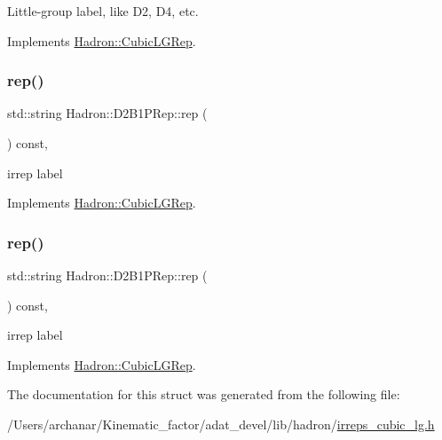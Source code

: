 Little-\/group label, like D2, D4, etc. 

Implements \mbox{\hyperlink{structHadron_1_1CubicLGRep_a9bdb14b519a611d21379ed96a3a9eb41}{Hadron\+::\+Cubic\+L\+G\+Rep}}.

\mbox{\label{structHadron_1_1D2B1PRep_ab8cddfe5f5e849b0b3d804576558b445}} 
\subsubsection{\texorpdfstring{rep()}{rep()}\hspace{0.1cm}{\footnotesize\ttfamily [1/2]}}
{\footnotesize\ttfamily std\+::string Hadron\+::\+D2\+B1\+P\+Rep\+::rep (\begin{DoxyParamCaption}{ }\end{DoxyParamCaption}) const\hspace{0.3cm}{\ttfamily [inline]}, {\ttfamily [virtual]}}

irrep label 

Implements \mbox{\hyperlink{structHadron_1_1CubicLGRep_a50f5ddbb8f4be4cee0106fa9e8c75e6c}{Hadron\+::\+Cubic\+L\+G\+Rep}}.

\mbox{\label{structHadron_1_1D2B1PRep_ab8cddfe5f5e849b0b3d804576558b445}} 
\subsubsection{\texorpdfstring{rep()}{rep()}\hspace{0.1cm}{\footnotesize\ttfamily [2/2]}}
{\footnotesize\ttfamily std\+::string Hadron\+::\+D2\+B1\+P\+Rep\+::rep (\begin{DoxyParamCaption}{ }\end{DoxyParamCaption}) const\hspace{0.3cm}{\ttfamily [inline]}, {\ttfamily [virtual]}}

irrep label 

Implements \mbox{\hyperlink{structHadron_1_1CubicLGRep_a50f5ddbb8f4be4cee0106fa9e8c75e6c}{Hadron\+::\+Cubic\+L\+G\+Rep}}.



The documentation for this struct was generated from the following file\+:\begin{DoxyCompactItemize}
\item 
/\+Users/archanar/\+Kinematic\+\_\+factor/adat\+\_\+devel/lib/hadron/\mbox{\hyperlink{lib_2hadron_2irreps__cubic__lg_8h}{irreps\+\_\+cubic\+\_\+lg.\+h}}\end{DoxyCompactItemize}

